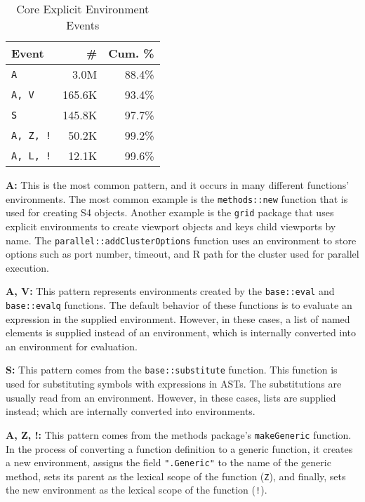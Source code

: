 \documentclass[10pt,review,sigplan,authorversion=true]{acmart}
\newcommand{\code}[1]{\lstinline |#1|\xspace}
\begin{document}
\begin{table}[!h]
  \small
  \caption{Core Explicit Environment Events} \label{table:core_explicit_env_seq}
  \centering
  \begin{tabular}{lrr}
    \toprule
    \textbf{Event}&\textbf{\#}&\textbf{Cum. \%}\\
    \midrule
    \texttt{A}&3.0M&88.4\%\\
    \texttt{A, V}&165.6K&93.4\%\\
    \texttt{S}&145.8K&97.7\%\\
    \texttt{A, Z, !}&50.2K&99.2\%\\
    \texttt{A, L, !}&12.1K&99.6\%\\
    \bottomrule
  \end{tabular}
\end{table}

\noindent
\textbf{A:} This is the most common pattern, and it occurs in many different
functions' environments. The most common example is the \code{methods::new}
function that is used for creating S4 objects. Another example is the
\code{grid} package that uses explicit environments to create viewport objects
and keys child viewports by name. The \code{parallel::addClusterOptions} function
uses an environment to store options such as port number, timeout, and R path
for the cluster used for parallel execution.

\noindent
\textbf{A, V:} This pattern represents environments created by the
\code{base::eval} and \code{base::evalq} functions. The default behavior of
these functions is to evaluate an expression in the supplied environment.
However, in these cases, a list of named elements is supplied instead of an
environment, which is internally converted into an environment for evaluation.

\noindent
\textbf{S:} This pattern comes from the \code{base::substitute} function. This
function is used for substituting symbols with expressions in ASTs. The
substitutions are usually read from an environment. However, in these cases,
lists are supplied instead; which are internally converted into environments.

\noindent
\textbf{A, Z, !:} This pattern comes from the methods package's
\code{makeGeneric} function. In the process of converting a function definition
to a generic function, it creates a new environment, assigns the field
\code{".Generic"} to the name of the generic method, sets its parent as the
lexical scope of the function (\texttt{Z}), and finally, sets the new
environment as the lexical scope of the function (\texttt{!}).
\end{document}
